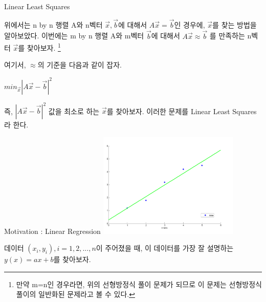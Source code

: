 \documentclass{beamer}
\begin{document}




\begin{frame}{Linear Least Squares} 

위에서는 n by n 행렬 A와 n벡터 $\vec{x}, \vec{b}$에 대해서 $A\vec{x} = \vec{b}$인 경우에, $\vec{x}$를 찾는 방법을 알아보았다. 이번에는 m by n 행렬 A와 m벡터 $\vec{b}$에 대해서 $A\vec{x} \approx \vec{b}$ 를 만족하는 n벡터 $\vec{x}$를 찾아보자. \footnote{만약 m=n인 경우라면, 위의 선형방정식 풀이 문제가 되므로 이 문제는 선형방정식 풀이의 일반화된 문제라고 볼 수 있다.} 

여기서, $\approx$의 기준을 다음과 같이 잡자. 

\vspace{5mm}

$ min_{\vec{x}} |A\vec{x} - \vec{b}|^2 $ 

\vspace{5mm}

즉, $|A\vec{x} - \vec{b}|^2 $ 값을 최소로 하는 $\vec{x}$를 찾아보자. 
\vspace{5mm}
이러한 문제를 Linear Least Squares라 한다. 

\end{frame}


\begin{frame}{Motivation : Linear Regression} 
\includegraphics[height=5cm,keepaspectratio]{lin}

데이터 $(x_i, y_i), i=1,2,...,n$이 주어졌을 때, 이 데이터를 가장 잘 설명하는 $y(x) = ax + b$를 찾아보자. 
\end{frame}
\end{document}
